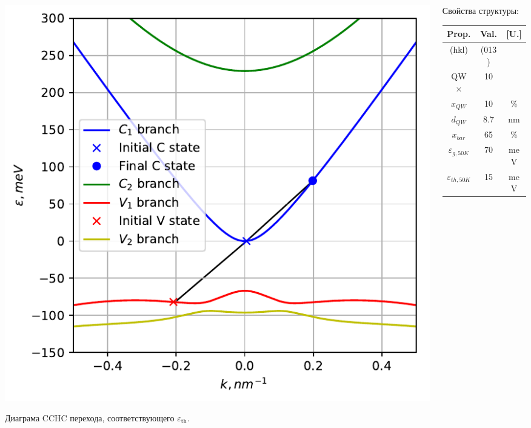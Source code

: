 \documentclass[9pt,pdf]{beamer}
\begin{document}
\begin{frame}
\begin{columns}
\begin{column}{0.7\textwidth}
\begin{overprint}
                    \begin{center}
                        \includegraphics[width=1\textwidth]{images/18um_impure_40K.pdf}
                    \end{center}
                    Диаграма CCHC перехода, соответствующего $\varepsilon_\text{th}$.
                \end{overprint}
            \end{column}
            \hfill
            \begin{column}{0.3\textwidth}
                Свойства структуры:
                \begin{center}
                    \begin{tabular}{c | c c}
                        Prop.   & Val.  & [U.]\\
                        \hline
                        (hkl)       &  (013)    &\\
                        QW $\times$ &   10      &\\
                        $x_{QW}$    & 10   & \%\\
                        $d_{QW}$    & 8.7  & nm\\
                        $x_{bar}$  & 65   & \%\\
                        $\varepsilon_{g, 50K}$ & 70 & meV\\
                        $\varepsilon_{th, 50K}$  & 15 & meV\\

\end{tabular}
\end{center}
\end{column}
\end{columns}
\end{frame}
\end{document}
